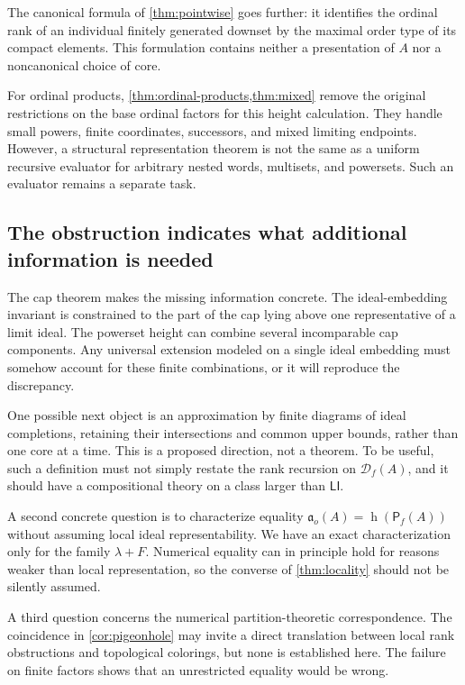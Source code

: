 \documentclass[11pt,letterpaper]{article}
\theoremstyle{teal}
\theoremstyle{definition}
\newcommand{\Pf}{\mathsf P_{\!f}}
\newcommand{\Df}{\mathcal D_{\!f}}
\newcommand{\hgt}{\operatorname{h}}
\newcommand{\ao}{\mathfrak a_o}
\newcommand{\LI}{\mathsf{LI}}
\begin{document}
The canonical formula of \cref{thm:pointwise} goes further: it identifies the ordinal rank of an individual finitely generated downset by the maximal order type of its compact elements. This formulation contains neither a presentation of $A$ nor a noncanonical choice of core.

For ordinal products, \cref{thm:ordinal-products,thm:mixed} remove the original restrictions on the base ordinal factors for this height calculation. They handle small powers, finite coordinates, successors, and mixed limiting endpoints. However, a structural representation theorem is not the same as a uniform recursive evaluator for arbitrary nested words, multisets, and powersets. Such an evaluator remains a separate task.

\subsection{The obstruction indicates what additional information is needed}
The cap theorem makes the missing information concrete. The ideal-embedding invariant is constrained to the part of the cap lying above one representative of a limit ideal. The powerset height can combine several incomparable cap components. Any universal extension modeled on a single ideal embedding must somehow account for these finite combinations, or it will reproduce the discrepancy.

One possible next object is an approximation by finite diagrams of ideal completions, retaining their intersections and common upper bounds, rather than one core at a time. This is a proposed direction, not a theorem. To be useful, such a definition must not simply restate the rank recursion on $\Df(A)$, and it should have a compositional theory on a class larger than $\LI$.

A second concrete question is to characterize equality $\ao(A)=\hgt(\Pf(A))$ without assuming local ideal representability. We have an exact characterization only for the family $\lambda+F$. Numerical equality can in principle hold for reasons weaker than local representation, so the converse of \cref{thm:locality} should not be silently assumed.

A third question concerns the numerical partition-theoretic correspondence. The coincidence in \cref{cor:pigeonhole} may invite a direct translation between local rank obstructions and topological colorings, but none is established here. The failure on finite factors shows that an unrestricted equality would be wrong.
\end{document}
